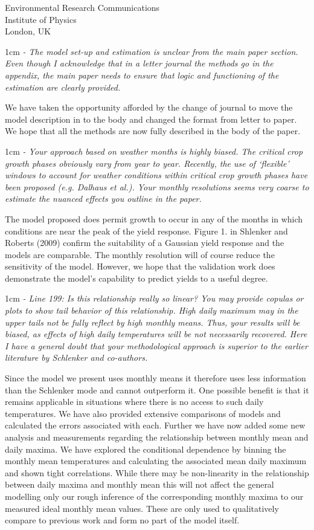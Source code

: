 \documentclass{letter}
\newcommand{\review}[1]{   
    \begin{adjustwidth}{1cm}{}
    \em{#1}
    \end{adjustwidth}
    }
\begin{document}
\begin{letter}{Environmental Research Communications \\ Institute of Physics \\ London, UK}
\review{
- The model set-up and estimation is unclear from the main paper section. Even though I acknowledge that in a letter journal the methods go in the appendix, the main paper needs to ensure that logic and functioning of the estimation are clearly provided.
}

We have taken the opportunity afforded by the change of journal to move the model description in to the body and changed the format from letter to paper. We hope that all the methods are now fully described in the body of the paper.

\review{
- Your approach based on weather months is highly biased. The critical crop growth phases obviously vary from year to year. Recently, the use of ‘flexible’ windows to account for weather conditions within critical crop growth phases have been proposed (e.g. Dalhaus et al.). Your monthly resolutions seems very coarse to estimate the nuanced effects you outline in the paper.
}

The model proposed does permit growth to occur in any of the months in which conditions are near the peak of the yield response. Figure 1. in Shlenker and Roberts (2009) confirm the suitability of a Gaussian yield response and the models are comparable. The monthly resolution will of course reduce the sensitivity of the model. However, we hope that the validation work does demonstrate the model's capability to predict yields to a useful degree.

\review{
- Line 199: Is this relationship really so linear? You may provide copulas or plots to show tail behavior of this relationship. High daily maximum may in the upper tails not be fully reflect by high monthly means. Thus, your results will be biased, as effects of high daily temperatures will be not necessarily recovered. Here I have a general doubt that your methodological approach is superior to the earlier literature by Schlenker and co-authors.
}

Since the model we present uses monthly means it therefore uses less information than the Schlenker mode and cannot outperform it. One possible benefit is that it remains applicable in situations where there is no access to such daily temperatures. We have also provided extensive comparisons of models and calculated the errors associated with each. Further we have now added some new analysis and measurements regarding the relationship between monthly mean and daily maxima. We have explored the conditional dependence by binning the monthly mean temperatures and calculating the associated mean daily maximum and shown tight correlations. While there may be non-linearity in the relationship between daily maxima and monthly mean this will not affect the general modelling only our rough inference of the corresponding monthly maxima to our measured ideal monthly mean values. These are only used to qualitatively compare to previous work and form no part of the model itself.


\end{letter}
\end{document}
